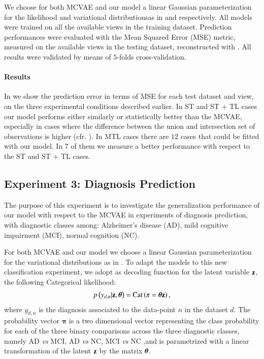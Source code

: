 We choose for both MCVAE and our model a linear Gaussian parameterization for the likelihood and variational distributionsas in  and  respectively.
All models were trained on all the available views in the training dataset.%
Prediction performances were evaluated with the Mean Squared Error (MSE) metric, measured on the available views in the testing dataset, reconstructed with .
All results were validated by means of $5$-folds cross-validation.

\paragraph{Results}
In  we show the prediction error in terms of MSE for each test dataset and view, on the three experimental conditions described earlier.
In ST and ST + TL cases our model performs either similarly or statistically better than the MCVAE, especially in cases where the difference between the union and intersection set of observations is higher (cfr. ).
In MTL cases there are $12$ cases that could be fitted with our model.
In $7$ of them we measure a better performance with respect to the ST and  ST + TL cases.

\subsection{Experiment 3: Diagnosis Prediction}


The purpose of this experiment is to investigate the generalization performance of our model with respect to the MCVAE in experiments of diagnosis prediction, with diagnostic classes among:
Alzheimer's disease (AD),
mild cognitive impairment (MCI),
normal cognition (NC).

For both MCVAE and our model we choose a linear Gaussian parameterization for the variational distributions as in .
To adapt the models to this new classification experiment, we adopt as decoding function for the latent variable $\mathbf{z}$, the following Categorical likelihood:
\begin{align}
\label{eq:classifier}
p\left(y_{d,n}|\mathbf{z},\boldsymbol{\theta}\right) = \operatorname{Cat}\left(\mathbf{\pi}=\boldsymbol{\theta}\mathbf{z}\right),
\end{align}
where $y_{d,n}$ is the diagnosis associated to the data-point $n$ in the dataset $d$.
The probability vector $\mathbf{\pi}$ is a two dimensional vector representing the class probability for each of the three binary comparisons across the three diagnostic classes, namely AD \textit{vs} MCI, AD \textit{vs} NC, MCI \textit{vs} NC ,and is parametrized with a linear transformation of the latent $\mathbf{z}$ by the matrix $\boldsymbol{\theta}$.

